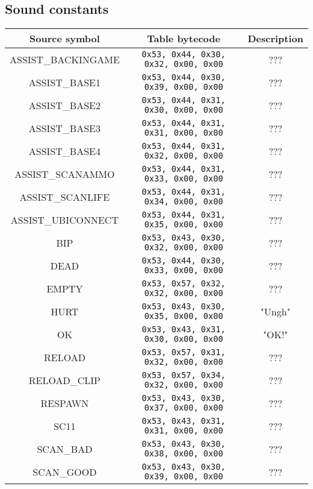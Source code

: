 \documentclass[12pt,a4paper]{scrbook}
\begin{document}
\subsection{Sound constants}
\label{sec:sndtab}
\begin{center}
  \begin{tabular}{ | c | c || c | }
    \hline
    Source symbol & Table bytecode & Description \\ \hline \hline
    ASSIST\_BACKINGAME & \texttt{0x53, 0x44, 0x30, 0x32, 0x00, 0x00} & ???  \\ \hline
    ASSIST\_BASE1 & \texttt{0x53, 0x44, 0x30, 0x39, 0x00, 0x00} & ???  \\ \hline
    ASSIST\_BASE2 & \texttt{0x53, 0x44, 0x31, 0x30, 0x00, 0x00} & ???  \\ \hline
    ASSIST\_BASE3 & \texttt{0x53, 0x44, 0x31, 0x31, 0x00, 0x00} & ???  \\ \hline
    ASSIST\_BASE4 & \texttt{0x53, 0x44, 0x31, 0x32, 0x00, 0x00} & ???  \\ \hline    
    ASSIST\_SCANAMMO & \texttt{0x53, 0x44, 0x31, 0x33, 0x00, 0x00} & ???  \\ \hline
    ASSIST\_SCANLIFE & \texttt{0x53, 0x44, 0x31, 0x34, 0x00, 0x00} & ???  \\ \hline
    ASSIST\_UBICONNECT & \texttt{0x53, 0x44, 0x31, 0x35, 0x00, 0x00} & ???  \\ \hline
    BIP & \texttt{0x53, 0x43, 0x30, 0x32, 0x00, 0x00} & ???  \\ \hline
    DEAD & \texttt{0x53, 0x44, 0x30, 0x33, 0x00, 0x00}  & ???  \\ \hline
    EMPTY & \texttt{0x53, 0x57, 0x32, 0x32, 0x00, 0x00} & ???  \\ \hline
    HURT & \texttt{0x53, 0x43, 0x30, 0x35, 0x00, 0x00} & "Ungh"  \\ \hline
	OK & \texttt{0x53, 0x43, 0x31, 0x30, 0x00, 0x00} & "OK!"  \\ \hline	
    RELOAD & \texttt{0x53, 0x57, 0x31, 0x32, 0x00, 0x00} & ???  \\ \hline
	RELOAD\_CLIP & \texttt{0x53, 0x57, 0x34, 0x32, 0x00, 0x00} & ???  \\ \hline
	RESPAWN & \texttt{0x53, 0x43, 0x30, 0x37, 0x00, 0x00} & ???  \\ \hline	
	SC11 & \texttt{0x53, 0x43, 0x31, 0x31, 0x00, 0x00} & ???  \\ \hline      
	SCAN\_BAD & \texttt{0x53, 0x43, 0x30, 0x38, 0x00, 0x00} & ???  \\ \hline
    SCAN\_GOOD & \texttt{0x53, 0x43, 0x30, 0x39, 0x00, 0x00} & ???  \\ \hline

\end{tabular}
\end{center}
\end{document}
